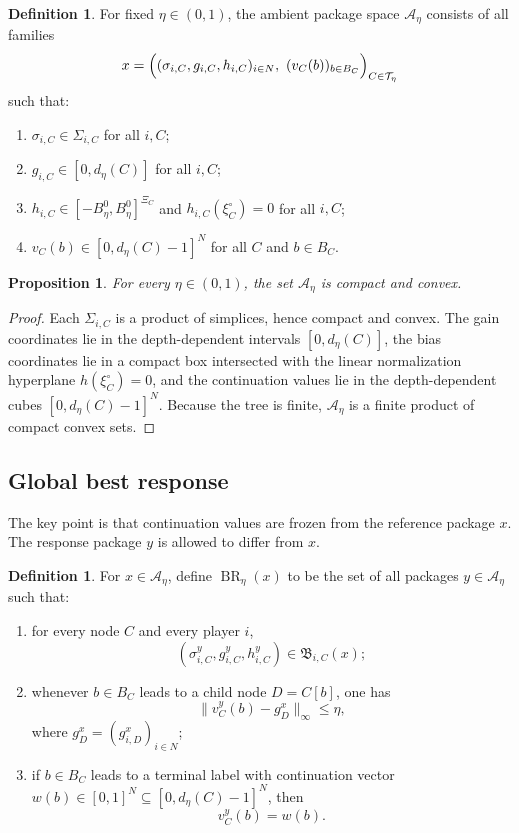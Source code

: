 \documentclass[12pt]{article}
\newtheorem{proposition}[theorem]{Proposition}
\theoremstyle{definition}
\newtheorem{definition}[theorem]{Definition}
\newcommand{\1}{\mathbf{1}}
\newcommand{\cA}{\mathcal{A}}
\newcommand{\cT}{\mathcal{T}}
\DeclareMathOperator{\BR}{BR}
\begin{document}
\begin{definition}
\label{def:Aeta}
For fixed $\eta\in(0,1)$, the ambient package space $\cA_\eta$ consists of all
families
\[
x=\Bigl((\sigma_{i,C},g_{i,C},h_{i,C})_{i\in N},\ (v_C(b))_{b\in B_C}\Bigr)_{C\in\cT_\eta}
\]
such that:
\begin{enumerate}[label=\textnormal{(A\arabic*)},leftmargin=2.8em]
\item $\sigma_{i,C}\in \Sigma_{i,C}$ for all $i,C$;
\item $g_{i,C}\in[0,d_\eta(C)]$ for all $i,C$;
\item $h_{i,C}\in[-B_\eta^0,B_\eta^0]^{\Xi_C}$ and
$h_{i,C}(\xi_C^\circ)=0$ for all $i,C$;
\item $v_C(b)\in[0,d_\eta(C)-1]^N$ for all $C$ and $b\in B_C$.
\end{enumerate}
\end{definition}

\begin{proposition}
\label{prop:Aeta-compact}
For every $\eta\in(0,1)$, the set $\cA_\eta$ is compact and convex.
\end{proposition}

\begin{proof}
Each $\Sigma_{i,C}$ is a product of simplices, hence compact and convex. The gain
coordinates lie in the depth-dependent intervals $[0,d_\eta(C)]$, the bias
coordinates lie in a compact box intersected with the linear normalization
hyperplane $h(\xi_C^\circ)=0$, and the continuation values lie in the
depth-dependent cubes $[0,d_\eta(C)-1]^N$. Because the tree is finite,
$\cA_\eta$ is a finite product of compact convex sets.
\end{proof}

\subsection{Global best response}

The key point is that continuation values are frozen from the reference package
$x$. The response package $y$ is allowed to differ from $x$.

\begin{definition}
\label{def:global-BR}
For $x\in\cA_\eta$, define $\BR_\eta(x)$ to be the set of all packages
$y\in\cA_\eta$ such that:
\begin{enumerate}[label=\textnormal{(G\arabic*)},leftmargin=2.8em]
\item for every node $C$ and every player $i$,
\[
(\sigma_{i,C}^y,g_{i,C}^y,h_{i,C}^y)\in \mathfrak B_{i,C}(x);
\]
\item whenever $b\in B_C$ leads to a child node $D=C[b]$, one has
\begin{equation}
\label{eq:frozen-continuation}
\|v_C^y(b)-g_D^x\|_\infty\le \eta,
\end{equation}
where $g_D^x=(g_{i,D}^x)_{i\in N}$;
\item if $b\in B_C$ leads to a terminal label with continuation vector
$w(b)\in[0,1]^N\subseteq[0,d_\eta(C)-1]^N$, then
\[
v_C^y(b)=w(b).
\]
\end{enumerate}
\end{definition}
\end{document}
